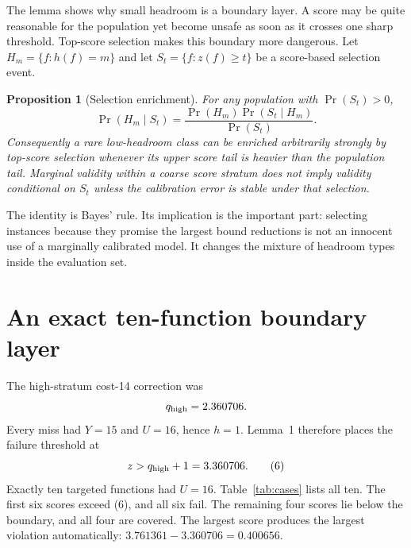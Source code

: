\documentclass[11pt]{article}
\newtheorem{proposition}{Proposition}
\begin{document}
The lemma shows why small headroom is a boundary layer.  A score may be quite
reasonable for the population yet become unsafe as soon as it crosses one
sharp threshold.  Top-score selection makes this boundary more dangerous.
Let $H_m=\{f:h(f)=m\}$ and let $S_t=\{f:z(f)\ge t\}$ be a score-based selection
event.

\begin{proposition}[Selection enrichment]
For any population with $\Pr(S_t)>0$,
\begin{equation}
 \Pr(H_m\mid S_t)
 =\frac{\Pr(H_m)\Pr(S_t\mid H_m)}{\Pr(S_t)}.             \label{eq:bayes}
\end{equation}
Consequently a rare low-headroom class can be enriched arbitrarily strongly
by top-score selection whenever its upper score tail is heavier than the
population tail.  Marginal validity within a coarse score stratum does not
imply validity conditional on $S_t$ unless the calibration error is stable
under that selection.
\end{proposition}

The identity is Bayes' rule.  Its implication is the important part: selecting
instances because they promise the largest bound reductions is not an
innocent use of a marginally calibrated model.  It changes the mixture of
headroom types inside the evaluation set.

\section{An exact ten-function boundary layer}

The high-stratum cost-14 correction was
\[
 q_{\rm high}=2.360706.
\]
Every miss had $Y=15$ and $U=16$, hence $h=1$.  Lemma~1 therefore places the
failure threshold at
\[
 z>q_{\rm high}+1=3.360706.                              \tag{6}
\]
Exactly ten targeted functions had $U=16$.  Table~\ref{tab:cases} lists all
ten.  The first six scores exceed (6), and all six fail.  The remaining four
scores lie below the boundary, and all four are covered.  The largest score
produces the largest violation automatically:
$3.761361-3.360706=0.400656$.
\end{document}
